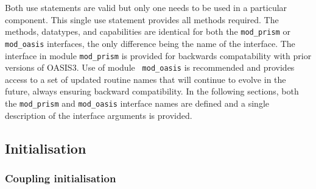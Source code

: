 Both use statements are valid but only one needs to be used in a particular component. This single use statement provides all methods required. The methods, datatypes, and capabilities
are identical for both the {\tt mod\_prism} or {\tt mod\_oasis}
interfaces, the only difference being the name of the interface. The
interface in module {\tt mod\_prism} is provided for backwards
compatability with prior versions of OASIS3. Use of module {\tt
  mod\_oasis} is recommended and provides access to a set of updated
routine names that will continue to evolve in the future, always
ensuring backward compatibility.  In the following sections, both the
{\tt mod\_prism} and {\tt mod\_oasis} interface names are defined and
a single description of the interface arguments is provided.

\subsection{Initialisation}
\label{subsubsec_Initialisation}

\subsubsection{Coupling initialisation}
\label{init_comp}

